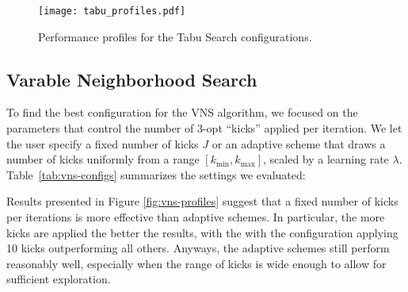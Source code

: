 \begin{figure}[H]
  \centering
  \texttt{[image: tabu\_profiles.pdf]}
  \caption{Performance profiles for the Tabu Search configurations.}
  \label{fig:tabu-profiles}
\end{figure}

\subsection{Varable Neighborhood Search}
\label{ssec:vns-tuning}

To find the best configuration for the VNS algorithm, we focused on the parameters that control the number of 3-opt “kicks” applied per iteration. We let the user specify a fixed number of kicks \(J\) or an adaptive scheme that draws a number of kicks uniformly from a range \([k_{\min},k_{\max}]\), scaled by a learning rate \(\lambda\). Table~\ref{tab:vns-configs} summarizes the settings we evaluated:

\begin{table}[H]
  \centering
  \caption{VNS configurations}
  \label{tab:vns-configs}
\end{table}

Results presented in Figure \ref{fig:vns-profiles} suggest that a fixed number of kicks per iterations is more effective than adaptive schemes. In particular, the more kicks are applied the better the results, with the with the configuration applying 10 kicks outperforming all others. Anyways, the adaptive schemes still perform reasonably well, especially when the range of kicks is wide enough to allow for sufficient exploration.

